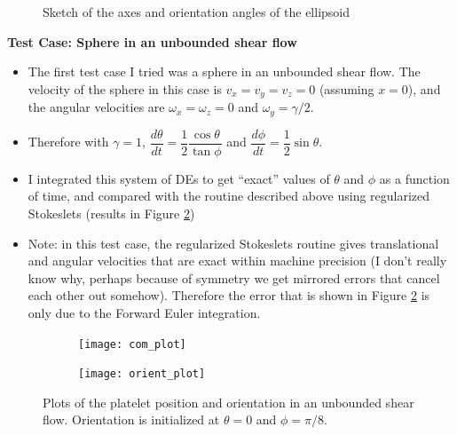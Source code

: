\documentclass{article}
\begin{document}
\begin{figure}
\begin{subfigure}{0.49\textwidth}
  \end{subfigure}
  \caption{Sketch of the axes and orientation angles of the ellipsoid}
  \label{fig:sketches}
\end{figure}

\textbf{Test Case: Sphere in an unbounded shear flow}
\begin{itemize}
\item The first test case I tried was a sphere in an unbounded shear
  flow. The velocity of the sphere in this case is $v_x = v_y = v_z =
  0$ (assuming $x = 0$), and the angular velocities are $\omega_x =
  \omega_z = 0$ and $\omega_y = \gamma/2$.
\item Therefore with $\gamma = 1$, $\dfrac{d\theta}{dt} = \dfrac{1}{2}
  \dfrac{\cos\theta}{\tan\phi}$ and $\dfrac{d\phi}{dt} = \dfrac{1}{2}
  \sin\theta$.
\item I integrated this system of DEs to get ``exact'' values of
  $\theta$ and $\phi$ as a function of time, and compared with the
  routine described above using regularized Stokeslets (results in
  Figure \ref{fig:com_plot})
\item Note: in this test case, the regularized Stokeslets routine
  gives translational and angular velocities that are exact within
  machine precision (I don't really know why, perhaps because of
  symmetry we get mirrored errors that cancel each other out
  somehow). Therefore the error that is shown in Figure
  \ref{fig:com_plot} is only due to the Forward Euler integration.
\end{itemize}

\begin{figure}
  \centering
  \begin{subfigure}{0.49\textwidth}
    \texttt{[image: com\_plot]}    
  \end{subfigure}
  \hfill
  \begin{subfigure}{0.49\textwidth}
    \texttt{[image: orient\_plot]}
  \end{subfigure}
  \caption{Plots of the platelet position and orientation in an
    unbounded shear flow. Orientation is initialized at $\theta = 0$
    and $\phi = \pi/8$.}
  \label{fig:com_plot}
\end{figure}

\newpage
\end{document}

